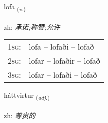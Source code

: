 \documentclass[frontgrid, backgrid]{flacards}\usepackage[]{graphicx}\usepackage[]{color}
\begin{document}
\renewcommand{\flhead}{\vskip5pt \fboxsep=0pt {\small\bfseries\footnotesize Sagnorð | 动词}}
\renewcommand{\fcfoot}{\vskip5pt \fboxsep=0pt \hspace{2pt}{\small\bfseries\footnotesize 2K}}

\renewcommand{\blhead}{\vskip5pt {\small\bfseries\footnotesize Sagnorð | 动词 }}
\renewcommand{\bcfoot}{\vskip5pt \hspace{2pt}{\small\bfseries\footnotesize 2K}}


{lofa \small{\textsubscript{(\textit{v.})}} \\[1ex] %
\textphonetic{[lɔːva]} \\
zh: \emph{承诺;称赞;允许} \\  [2ex]
\renewcommand*{\arraystretch}{0.8}
\begin{tabular}{p{1cm}l}
\textsc{1sg}: & lofa -- lofaði -- lofað \\ 
\textsc{2sg}: & lofar -- lofaðir -- lofað \\ 
\textsc{3sg}: & lofar -- lofaði -- lofað \\ 
\end{tabular}
}

\renewcommand{\flhead}{\vskip5pt \fboxsep=0pt {\small\bfseries\footnotesize Lýsingarorð | 形容词}}
\renewcommand{\fcfoot}{\vskip5pt \fboxsep=0pt \hspace{2pt}{\small\bfseries\footnotesize 2K}}

\renewcommand{\blhead}{\vskip5pt {\small\bfseries\footnotesize Lýsingarorð | 形容词 }}
\renewcommand{\bcfoot}{\vskip5pt \hspace{2pt}{\small\bfseries\footnotesize 2K}}


{háttvirtur \small{\textsubscript{(\textit{adj.})}} \\[1ex] %
 \\
zh: \emph{尊贵的} \\  [2ex]
\renewcommand*{\arraystretch}{0.8}
}
\end{document}
